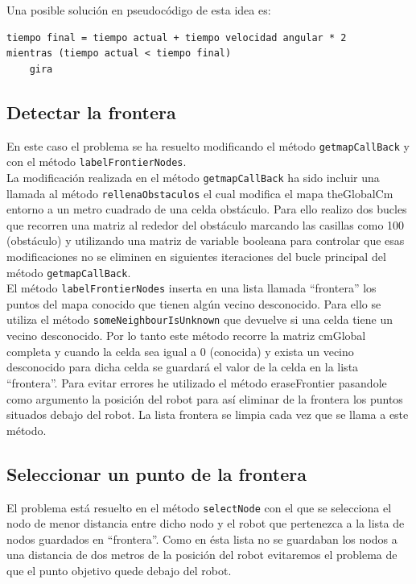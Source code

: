 \documentclass[11pt]{article}
\begin{document}
Una posible solución en pseudocódigo de esta idea es:

\begin{verbatim}
tiempo final = tiempo actual + tiempo velocidad angular * 2
mientras (tiempo actual < tiempo final)
    gira
\end{verbatim}


\subsection{Detectar la frontera}
En este caso el problema se ha resuelto modificando el método \texttt{getmapCallBack} y con el método \texttt{labelFrontierNodes}.\\

La modificación realizada en el método \texttt{getmapCallBack} ha sido incluir una llamada al método \texttt{rellenaObstaculos} el cual modifica el mapa theGlobalCm entorno a un metro cuadrado de una celda obstáculo. Para ello realizo dos bucles que recorren una matriz al rededor del obstáculo marcando las casillas como 100 (obstáculo) y utilizando una matriz de variable booleana para controlar que esas modificaciones no se eliminen en siguientes iteraciones del bucle principal del método \texttt{getmapCallBack}.\\

El método \texttt{labelFrontierNodes} inserta en una lista llamada ``frontera'' los puntos del mapa conocido que tienen algún vecino desconocido. Para ello se utiliza el método \texttt{someNeighbourIsUnknown} que devuelve si una celda tiene un vecino desconocido. Por lo tanto este método recorre la matriz cmGlobal completa y cuando la celda sea igual a 0 (conocida) y exista un vecino desconocido para dicha celda se guardará el valor de la celda en la lista ``frontera''. Para evitar errores he utilizado el método eraseFrontier pasandole como argumento la posición del robot para así eliminar de la frontera los puntos situados debajo del robot. La lista frontera se limpia cada vez que se llama a este método.

\subsection{Seleccionar un punto de la frontera}
El problema está resuelto en el método \texttt{selectNode} con el que se selecciona el nodo de menor distancia entre dicho nodo y el robot que pertenezca a la lista de nodos guardados en ``frontera''. Como en ésta lista no se guardaban los nodos a una distancia de dos metros de la posición del robot evitaremos el problema de que el punto objetivo quede debajo del robot.
\end{document}
